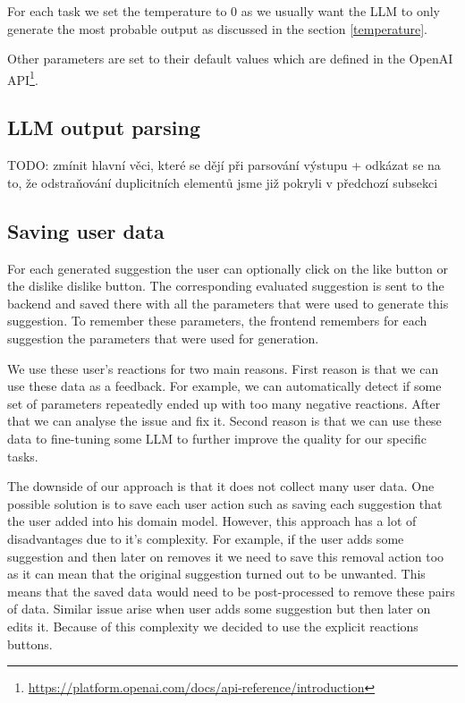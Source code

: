 For each task we set the temperature to $0$ as we usually want the LLM to only generate the most probable output as discussed in the section \ref{temperature}.

Other parameters are set to their default values which are defined in the OpenAI API\footnote{\url{https://platform.openai.com/docs/api-reference/introduction}}.


\subsection{LLM output parsing}

TODO: zmínit hlavní věci, které se dějí při parsování výstupu + odkázat se na to, že odstraňování duplicitních elementů jsme již pokryli v předchozí subsekci \\


\subsection{Saving user data}

For each generated suggestion the user can optionally click on the like button or the dislike dislike button. The corresponding evaluated suggestion is sent to the backend and saved there with all the parameters that were used to generate this suggestion. To remember these parameters, the frontend remembers for each suggestion the parameters that were used for generation.

We use these user's reactions for two main reasons. First reason is that we can use these data as a feedback. For example, we can automatically detect if some set of parameters repeatedly ended up with too many negative reactions. After that we can analyse the issue and fix it. Second reason is that we can use these data to fine-tuning some LLM to further improve the quality for our specific tasks.

The downside of our approach is that it does not collect many user data. One possible solution is to save each user action such as saving each suggestion that the user added into his domain model. However, this approach has a lot of disadvantages due to it's complexity. For example, if the user adds some suggestion and then later on removes it we need to save this removal action too as it can mean that the original suggestion turned out to be unwanted. This means that the saved data would need to be post-processed to remove these pairs of data. Similar issue arise when user adds some suggestion but then later on edits it. Because of this complexity we decided to use the explicit reactions buttons.


